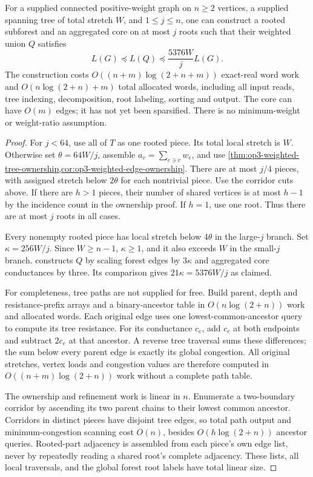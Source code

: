 \begin{theorem}
\label{thm:op3-supplied-tree-constructor}
For a supplied connected positive-weight graph on $n\geq2$ vertices,
a supplied spanning tree of total stretch $W$, and $1\leq j\leq n$,
one can construct a rooted subforest and an aggregated core on at most
$j$ roots such that their weighted union $Q$ satisfies
\[
 L(G)\preceq L(Q)\preceq \frac{5376W}{j}L(G).
\]
The construction costs $O((n+m)\log(2+n+m))$ exact-real word work and
$O(n\log(2+n)+m)$ total allocated words, including all input reads,
tree indexing, decomposition, root labeling, sorting and output.
The core can have $O(m)$ edges; it has not yet been sparsified.
There is no minimum-weight or weight-ratio assumption.
\end{theorem}
\begin{proof}
For $j<64$, use all of $T$ as one rooted piece. Its total local stretch
is $W$. Otherwise set $\theta=64W/j$, assemble
$a_v=\sum_{e\ni v}w_e$, and use
\cref{thm:op3-weighted-tree-ownership,cor:op3-weighted-edge-ownership}.
There are at most $j/4$ pieces, with assigned stretch below
$2\theta$ for each nontrivial piece. Use the corridor cuts above.
If there are $h>1$ pieces, their number of shared vertices is at most
$h-1$ by the incidence count in the ownership proof. If $h=1$, use
one root. Thus there are at most $j$ roots in all cases.

Every nonempty rooted piece has local stretch below $4\theta$ in
the large-$j$ branch. Set $\kappa=256W/j$. Since $W\geq n-1$,
$\kappa\geq1$, and it also exceeds $W$ in the small-$j$ branch.
 constructs $Q$ by
scaling forest edges by $3\kappa$ and aggregated core conductances
by three. Its comparison gives $21\kappa=5376W/j$ as claimed.

For completeness, tree paths are not supplied for free. Build parent,
depth and resistance-prefix arrays and a binary-ancestor table in
$O(n\log(2+n))$ work and allocated words. Each original edge uses
one lowest-common-ancestor query to compute its tree resistance.
For its conductance $c_e$, add $c_e$ at both endpoints and subtract
$2c_e$ at that ancestor. A reverse tree traversal sums these differences;
the sum below every parent edge is exactly its global congestion.
All original stretches, vertex loads and congestion values are therefore
computed in $O((n+m)\log(2+n))$ work without a complete path table.

The ownership and refinement work is linear in $n$. Enumerate a
two-boundary corridor by ascending its two parent chains to their
lowest common ancestor. Corridors in distinct pieces have disjoint
tree edges, so total path output and minimum-congestion scanning cost
$O(n)$, besides $O(h\log(2+n))$ ancestor queries. Rooted-part adjacency
is assembled from each piece's own edge list, never by repeatedly
reading a shared root's complete adjacency. These lists, all local
traversals, and the global forest root labels have total linear size.


\end{proof}
